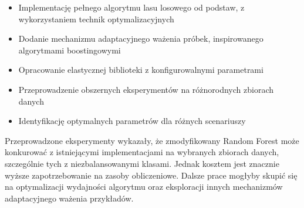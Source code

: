 \documentclass[11pt,a4paper]{article}
\begin{document}
\begin{itemize}
    \item Implementację pełnego algorytmu lasu losowego od podstaw, z wykorzystaniem technik optymalizacyjnych
    \item Dodanie mechanizmu adaptacyjnego ważenia próbek, inspirowanego algorytmami boostingowymi
    \item Opracowanie elastycznej biblioteki z konfigurowalnymi parametrami
    \item Przeprowadzenie obszernych eksperymentów na różnorodnych zbiorach danych
    \item Identyfikację optymalnych parametrów dla różnych scenariuszy
\end{itemize}

Przeprowadzone eksperymenty wykazały, że zmodyfikowany Random Forest może konkurować z istniejącymi implementacjami na wybranych zbiorach danych, szczególnie tych z niezbalansowanymi klasami. Jednak kosztem jest znacznie wyższe zapotrzebowanie na zasoby obliczeniowe. Dalsze prace mogłyby skupić się na optymalizacji wydajności algorytmu oraz eksploracji innych mechanizmów adaptacyjnego ważenia przykładów.
\end{document}

